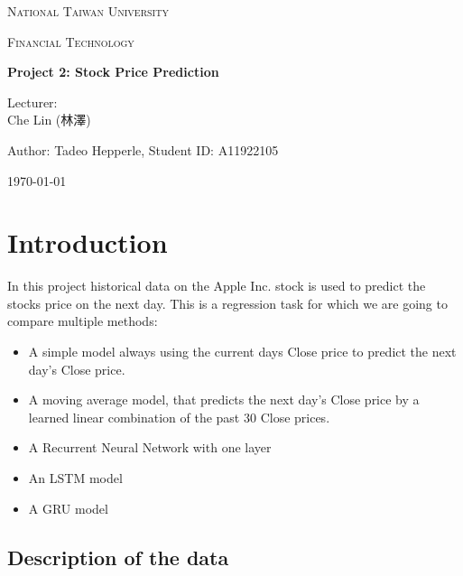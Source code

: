 \documentclass[utf8x]{ctexart}
\begin{document}
\begin{titlepage}
    \centering
    {\scshape\LARGE National Taiwan University \par}
    \vspace{1cm}
    {\scshape\Large Financial Technology \par}
    \vspace{2cm}
    {\huge\bfseries Project 2: Stock Price Prediction \par}
    \vspace{2cm}
    {\Large Lecturer:\\
        Che Lin (林澤) \par}
    \vspace{1cm}
    {\Large Author: Tadeo Hepperle, Student ID: A11922105 \par}
    \vfill
    {\large \today\par}
\end{titlepage}


\tableofcontents

\cleardoublepage

\section{Introduction}

In this project historical data on the Apple Inc. stock is used to predict the stocks price on the next day. This is a regression task for which we are going to compare multiple methods:
\begin{itemize}
    \item A simple model always using the current days Close price to predict the next day's Close price.
    \item A moving average model, that predicts the next day's Close price by a learned linear combination of the past 30 Close prices.
    \item A Recurrent Neural Network with one layer
    \item An LSTM model
    \item A GRU model
\end{itemize}

\subsection{Description of the data}
\end{document}
